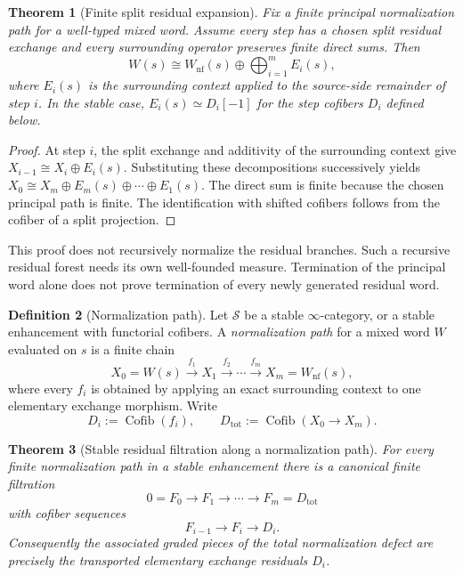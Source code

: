 \documentclass[11pt]{article}
\newtheorem{theorem}{Theorem}[section]
\theoremstyle{definition}
\newtheorem{definition}[theorem]{Definition}
\theoremstyle{remark}
\newcommand{\Cofib}{\operatorname{Cofib}}
\begin{document}
\begin{theorem}[Finite split residual expansion]\label{thm:split-expansion}
Fix a finite principal normalization path for a well-typed mixed word. Assume every step has a chosen split residual exchange and every surrounding operator preserves finite direct sums. Then
\[
W(s)\cong W_{\mathrm{nf}}(s)\oplus\bigoplus_{i=1}^m E_i(s),
\]
where $E_i(s)$ is the surrounding context applied to the source-side remainder of step $i$. In the stable case, $E_i(s)\simeq D_i[-1]$ for the step cofibers $D_i$ defined below.
\end{theorem}

\begin{proof}
At step $i$, the split exchange and additivity of the surrounding context give
$X_{i-1}\cong X_i\oplus E_i(s)$. Substituting these decompositions successively yields
$X_0\cong X_m\oplus E_m(s)\oplus\cdots\oplus E_1(s)$.
The direct sum is finite because the chosen principal path is finite. The identification with shifted cofibers follows from the cofiber of a split projection.
\end{proof}

This proof does not recursively normalize the residual branches. Such a recursive residual forest needs its own well-founded measure. Termination of the principal word alone does not prove termination of every newly generated residual word.

\begin{definition}[Normalization path]
Let $\mathcal S$ be a stable $\infty$-category, or a stable enhancement with functorial cofibers. A \emph{normalization path} for a mixed word $W$ evaluated on $s$ is a finite chain
\[
X_0=W(s)\xrightarrow{f_1}X_1\xrightarrow{f_2}\cdots\xrightarrow{f_m}X_m=W_{\mathrm{nf}}(s),
\]
where every $f_i$ is obtained by applying an exact surrounding context to one elementary exchange morphism. Write
\[
D_i:=\Cofib(f_i),
\qquad
D_{\mathrm{tot}}:=\Cofib(X_0\to X_m).
\]
\end{definition}

\begin{theorem}[Stable residual filtration along a normalization path]\label{thm:stable-filtration}
For every finite normalization path in a stable enhancement there is a canonical finite filtration
\[
0=F_0\longrightarrow F_1\longrightarrow\cdots\longrightarrow F_m=D_{\mathrm{tot}}
\]
with cofiber sequences
\[
F_{i-1}\longrightarrow F_i\longrightarrow D_i.
\]
Consequently the associated graded pieces of the total normalization defect are precisely the transported elementary exchange residuals $D_i$.
\end{theorem}
\end{document}
